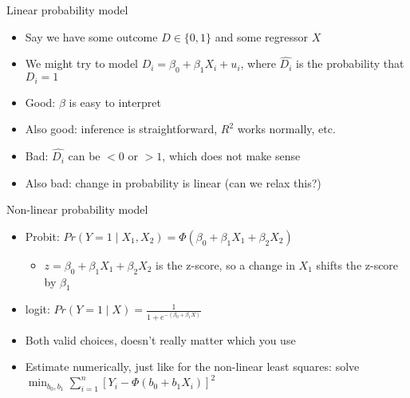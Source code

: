 \documentclass[aspectratio=169]{beamer}
\begin{document}
\begin{frame}{Linear probability model}
    \begin{itemize}
        \item Say we have some outcome $D \in \{0,1\}$ and some regressor $X$
        \item We might try to model $D_i = \beta_0 + \beta_1 X_i + u_i$, where $\hat{D_i}$ is the probability that $D_i = 1$
        \item Good: $\beta$ is easy to interpret
        \item Also good: inference is straightforward, $R^2$ works normally, etc.
        \item Bad: $\hat{D_i}$ can be $< 0$ or $> 1$, which does not make sense
        \item Also bad: change in probability is linear (can we relax this?)
    \end{itemize}
\end{frame}


\begin{frame}{Non-linear probability model}
    \begin{itemize}
        \item Probit: $Pr \left(Y=1 \mid X_1, X_2\right)=\Phi\left(\beta_0+\beta_1 X_1+\beta_2 X_2\right)$
        \begin{itemize}
            \item $ z = \beta_0+\beta_1 X_1+\beta_2 X_2 $ is the z-score, so a change in $X_1$ shifts the z-score by $\beta_1$
        \end{itemize}
        \item logit: $Pr (Y=1 \mid X) = \frac{1}{1+e^{-\left(\beta_0+\beta_1 X\right)}}$
        \item Both valid choices, doesn't really matter which you use
        \item Estimate numerically, just like for the non-linear least squares:
    solve $ \min _{b_0, b_1} \sum_{i=1}^n\left[Y_i-\Phi\left(b_0+b_1 X_i\right)\right]^2$
    \end{itemize}
\end{frame}
\end{document}
